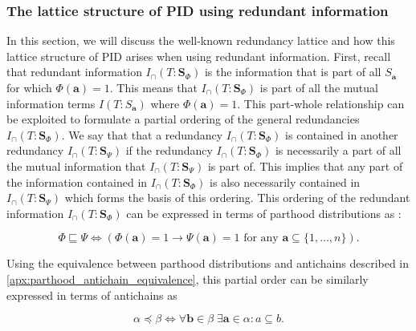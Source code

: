 \documentclass[10pt]{article}
\renewcommand\autoref[1]{\cref{#1}}
\theoremstyle{definition}
\theoremstyle{plain}
\begin{document}
\subsubsection{The lattice structure of PID using redundant information}
\label{apx:lattice}

In this section, we will discuss the well-known redundancy lattice and how this lattice structure of PID \citep{williams_nonnegative_2010} arises when using redundant information. First, recall that redundant information $I_\cap(T:\bm S_\Phi)$ is the information that is part of all $S_{\bm a}$ for which $\Phi(\bm a ) = 1$. This means that $I_\cap(T: \bm S_\Phi)$ is part of all the mutual information terms $I(T: S_{\bm a})$ where $\Phi(\bm a)=1$. This part-whole relationship can be exploited to formulate a partial ordering of the general redundancies $I_\cap(T:\bm S_\Phi)$. We say that that a redundancy $I_\cap(T:\bm S_\Phi)$ is contained in another redundancy $I_\cap(T:\bm S_\Psi)$ if the redundancy $I_\cap(T:\bm S_\Phi)$ is necessarily a part of all the mutual information that $I_\cap(T:\bm S_\Psi)$ is part of. This implies that any part of the information contained in $I_\cap(T:\bm S_\Phi)$ is also necessarily contained in $I_\cap(T:\bm S_\Psi)$ which forms the basis of this ordering. This ordering of the redundant information $I_\cap(T:\bm S_\Phi)$ can be expressed in terms of parthood distributions as \citep[Subsection 2.iii]{gutknecht_bits_2021}: 

\begin{equation}
    \Phi \sqsubseteq \Psi \Leftrightarrow (\Phi(\bm a) = 1 \to \Psi(\bm a) = 1 \text{ for any } \bm a \subseteq \{1, \dots, n\}).
\end{equation}

Using the equivalence between parthood distributions and antichains described in \autoref{apx:parthood_antichain_equivalence}, this partial order can be similarly expressed in terms of antichains as \citep{williams_nonnegative_2010}

\begin{equation}
    \alpha \preceq \beta \Leftrightarrow \forall \bm b \in \beta \; \exists \bm a \in \alpha : a \subseteq b.
\end{equation}
\end{document}
